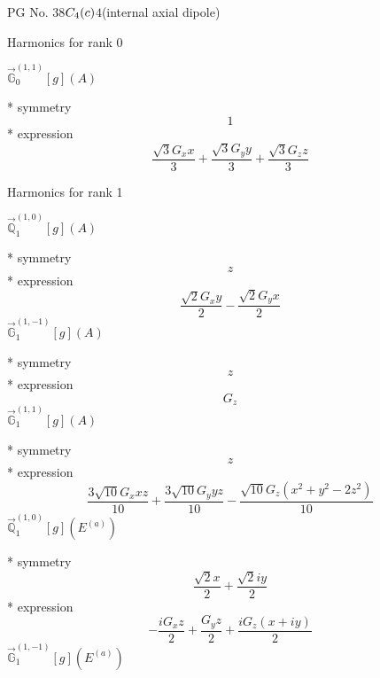 \documentclass[fleqn,8pt]{jsarticle}
\begin{document}
\setcounter{MaxMatrixCols}{32}

\renewcommand{\tablename}{Table~}
\renewcommand{\figurename}{Figure~}
\begin{center}
\LARGE
PG No. 38\quad$C_{\rm 4}(c)$\quad$4$\quad[ tetragonal ] (internal axial dipole)
\end{center}

\noindent * Harmonics for rank 0

\noindent\quad $\vec{\mathbb{G}}_{0}^{(1,1)}[g](A)$

\noindent\quad ** symmetry
\begin{dmath*}
1
\end{dmath*}
\noindent\quad ** expression
\begin{dmath*}
\frac{\sqrt{3} G_{x} x}{3} + \frac{\sqrt{3} G_{y} y}{3} + \frac{\sqrt{3} G_{z} z}{3}
\end{dmath*}

\noindent * Harmonics for rank 1

\noindent\quad $\vec{\mathbb{Q}}_{1}^{(1,0)}[g](A)$

\noindent\quad ** symmetry
\begin{dmath*}
z
\end{dmath*}
\noindent\quad ** expression
\begin{dmath*}
\frac{\sqrt{2} G_{x} y}{2} - \frac{\sqrt{2} G_{y} x}{2}
\end{dmath*}
\noindent\quad $\vec{\mathbb{G}}_{1}^{(1,-1)}[g](A)$

\noindent\quad ** symmetry
\begin{dmath*}
z
\end{dmath*}
\noindent\quad ** expression
\begin{dmath*}
G_{z}
\end{dmath*}
\noindent\quad $\vec{\mathbb{G}}_{1}^{(1,1)}[g](A)$

\noindent\quad ** symmetry
\begin{dmath*}
z
\end{dmath*}
\noindent\quad ** expression
\begin{dmath*}
\frac{3 \sqrt{10} G_{x} x z}{10} + \frac{3 \sqrt{10} G_{y} y z}{10} - \frac{\sqrt{10} G_{z} \left(x^{2} + y^{2} - 2 z^{2}\right)}{10}
\end{dmath*}
\noindent\quad $\vec{\mathbb{Q}}_{1}^{(1,0)}[g](E^{(a)})$

\noindent\quad ** symmetry
\begin{dmath*}
\frac{\sqrt{2} x}{2} + \frac{\sqrt{2} i y}{2}
\end{dmath*}
\noindent\quad ** expression
\begin{dmath*}
- \frac{i G_{x} z}{2} + \frac{G_{y} z}{2} + \frac{i G_{z} \left(x + i y\right)}{2}
\end{dmath*}
\noindent\quad $\vec{\mathbb{G}}_{1}^{(1,-1)}[g](E^{(a)})$
\end{document}

